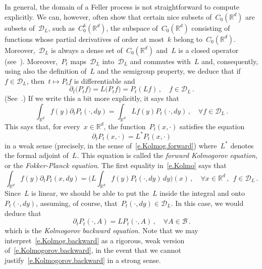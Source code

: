 \documentclass[11pt,twoside]{article} %
\numberwithin{equation}{section}
\theoremstyle{definition}
\newcommand*{\Rd}{\ensuremath{\mathbb{R}^d}}
\begin{document}
In general, the domain of a Feller process is not straightforward to compute explicitly. We can, however, often show that certain nice subsets of~$C_0(\Rd)$ are subsets of~$\mathscr{D}_L$, such as~$C^k_0(\Rd)$, the subspace of~$C_0(\Rd)$ consisting of functions whose partial derivatives of order at most~$k$ belong to~$C_0(\Rd)$. Moreover,~$\mathscr{D}_L$ is always a dense set of~$C_0(\Rd)$ and~$L$ is a closed operator (see~\cite[VII.1.3]{RY}). 
Moreover,~$P_t$ maps~$\mathscr{D}_L$ into~$\mathscr{D}_L$ and commutes with~$L$ and,  consequently, using also the definition of~$L$ and the semigroup property, we deduce that if~$f\in \mathscr{D}_L$, then~$t \mapsto P_t f$ is differentiable and
\begin{equation}
\label{e.Kolmo}
\partial_t \bigl( P_t f \bigr) = L \bigl( P_t f \bigr) = P_t ( Lf) \,, \quad f\in \mathscr{D}_L\,.
\end{equation}
(See~\cite[VII.1.2]{RY}.) If we write this a bit more explicitly, it says that 
\begin{equation}
\label{e.Kolmog.forward}
\int_{\Rd} f(y) \partial_t P_t(\cdot,dy) = 
\int_{\Rd} Lf (y) P_t(\cdot,dy) 
\,, \quad \forall f \in \mathscr{D}_L\,.
\end{equation}
This says that, for every~$x\in\Rd$, the function~$P_t(x,\cdot)$ satisfies the equation
\begin{equation}
\label{e.Kolmogorov.forward.weak}
\partial_t P_t(x,\cdot) = L^* P_t(x,\cdot)
\end{equation}
in a weak sense (precisely, in the sense of~\eqref{e.Kolmog.forward}) where~$L^*$ denotes the formal adjoint of~$L$.
This equation is called the \emph{forward Kolmogorov equation}, or the \emph{Fokker-Planck equation}. 
The first equality in~\eqref{e.Kolmo} says that 
\begin{equation}
\label{e.Kolmog.backward}
\int_{\Rd} f(y) \partial_t  P_t(x,dy) = 
\biggr( L\int_{\Rd} f (y)  P_t(\cdot,dy) \, dy \biggr)(x) 
\,, \quad \forall x\in\Rd\,, \ \ f \in \mathscr{D}_L\,.
\end{equation}
Since~$L$ is linear, we should be able to put the~$L$ inside the integral and onto~$P_t(\cdot,dy)$, assuming, of course, that~$P_t(\cdot,dy) \in \mathscr{D}_L$. In this case, we would deduce that 
\begin{equation}
\label{e.Kolmogorov.backward}
\partial_t P_t(\cdot,A) = LP_t(\cdot,A) \,, \quad \forall A\in \mathscr{B}\,.
\end{equation}
which is the \emph{Kolmogorov backward equation}. Note that we may interpret~\eqref{e.Kolmog.backward} as a rigorous, weak version of~\eqref{e.Kolmogorov.backward}, in the event that we cannot justify~\eqref{e.Kolmogorov.backward} in a strong sense. 
\end{document}
